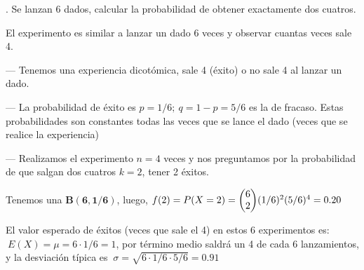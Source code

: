 \vspace{4mm} \begin{example}
.	Se lanzan 6 dados, calcular la probabilidad de obtener exactamente dos cuatros.

\vspace{4mm} El experimento es similar a lanzar un dado 6 veces y observar cuantas veces sale 4.

\vspace{2mm} --- Tenemos una experiencia dicotómica, sale 4 (éxito) o no sale 4 al lanzar un dado. 	

--- La probabilidad de éxito es $p=1/6;\ q=1-p=5/6$ es la de fracaso. Estas probabilidades son constantes todas las veces que se lance el dado (veces que se realice la experiencia)

--- Realizamos el experimento $n=4$ veces y nos preguntamos por la probabilidad de que salgan dos cuatros $k=2$, tener 2 éxitos.

\vspace{2mm} Tenemos una $\boldsymbol{B(6,1/6)}$, luego, $f(2)=P(X=2)=\mqty(6\\2)(1/6)^2(5/6)^4=0.20$

\vspace{2mm} El valor esperado de éxitos (veces que sale el 4) en estos 6 experimentos es:
$\ E(X)=\mu=6\cdot 1/6=1$, por término medio saldrá un 4 de cada 6 lanzamientos, y la desviación típica es $\ \sigma=\sqrt{6\cdot 1/6\cdot 5/6}=0.91$
\end{example}


